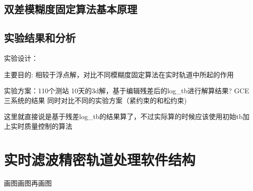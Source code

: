 \subsection{双差模糊度固定算法基本原理}

\subsection{实验结果和分析}

实验设计：

主要目的:
相较于浮点解，对比不同模糊度固定算法在实时轨道中所起的作用

实验方案：110个测站  10天的3d解，基于编辑残差后的log\_tb进行解算结果? GCE三系统的结果
同时对比不同的实验方案（紧约束的和松约束)

这里就直接说是基于残差log\_tb的结果算了，不过实际算的时候应该使用初始tb加上实时质量控制的算法

\section{实时滤波精密轨道处理软件结构}

画图画图再画图
